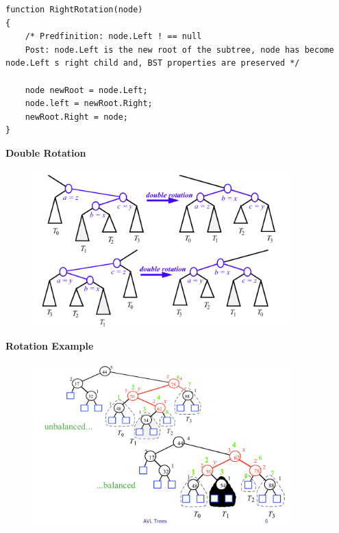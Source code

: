 \documentclass[a4paper,10pt]{report}
\begin{document}
\begin{lstlisting}
function RightRotation(node)
{
	/* Predfinition: node.Left ! == null
	Post: node.Left is the new root of the subtree, node has become node.Left s right child and, BST properties are preserved */

	node newRoot = node.Left;
	node.left = newRoot.Right;
	newRoot.Right = node;
}
\end{lstlisting}
\newpage
\textbf{Double Rotation}
\begin{figure}[H]
	\begin{center}
  		\includegraphics[width=0.9\textwidth]{img/doublerotation.png}
	\end{center}
\end{figure}
\textbf{Rotation Example}
\begin{figure}[H]
	\begin{center}
  		\includegraphics[width=0.9\textwidth]{img/rotationexample.png}
	\end{center}
\end{figure}
\newpage
\end{document}

